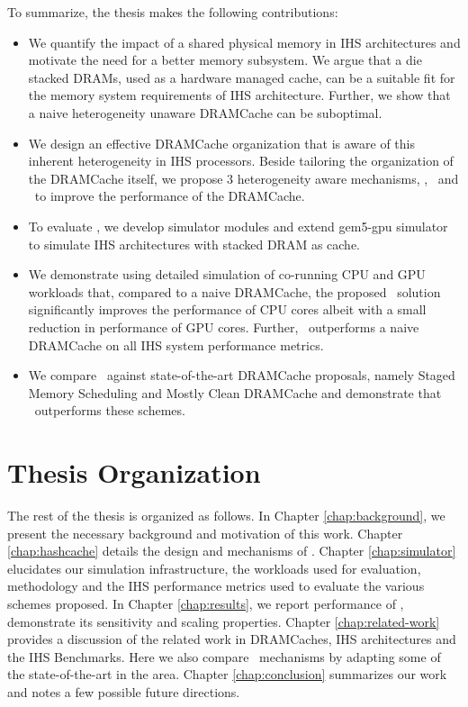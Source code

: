 \par To summarize, the thesis makes the following contributions:
\begin{itemize}
	\item We quantify the impact of a shared physical memory in IHS architectures and motivate the need for a better memory subsystem. We argue that a die stacked DRAMs, used as a hardware managed cache, can be a suitable fit for the memory system requirements of IHS architecture. Further, we show that a naive heterogeneity unaware DRAMCache can be suboptimal.
	\item We design an effective DRAMCache organization that is aware of this inherent heterogeneity in IHS processors. Beside tailoring the organization of the DRAMCache itself, we propose 3 heterogeneity aware mechanisms, \prioname, \bypassname\ and \chaining\ to improve the performance of the DRAMCache.
	\item To evaluate \cachename, we develop simulator modules and extend gem5-gpu simulator to simulate IHS architectures with stacked DRAM as cache.
	\item We demonstrate using detailed simulation of co-running CPU and GPU workloads that, compared to a naive DRAMCache, the proposed \cachename\ solution significantly improves the performance of CPU cores albeit with a small reduction in performance of GPU cores. Further, \cachename\ outperforms a naive DRAMCache on all IHS system performance metrics.
	\item We compare \cachename\ against state-of-the-art DRAMCache proposals, namely Staged Memory Scheduling \cite{sms} and Mostly Clean DRAMCache \cite{mostly-clean} and demonstrate that \cachename\ outperforms these schemes.
\end{itemize}

\section{Thesis Organization}
The rest of the thesis is organized as follows. In Chapter \ref{chap:background}, we present the necessary background and motivation of this work. 
Chapter \ref{chap:hashcache} details the design and mechanisms of \cachename.
Chapter \ref{chap:simulator} elucidates our simulation infrastructure, the workloads used for evaluation, methodology and the IHS performance metrics used to evaluate the various schemes proposed. 
In Chapter \ref{chap:results}, we report performance of \cachename, demonstrate its sensitivity and scaling properties. Chapter \ref{chap:related-work} provides a discussion of the related work in DRAMCaches, IHS architectures and the IHS Benchmarks. Here we also compare \cachename\ mechanisms by adapting some of the state-of-the-art in the area. Chapter \ref{chap:conclusion} summarizes our work and notes a few possible future directions.